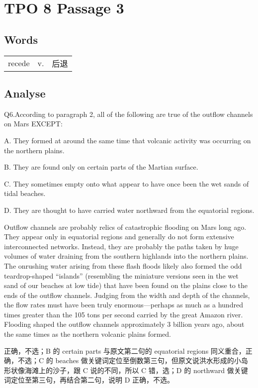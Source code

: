 \section{TPO 8 Passage 3}

\subsection{Words}

\begin{tabular}{lll}
    recede & v. & 后退 \\
\end{tabular}

\subsection{Analyse}

\begin{blk}
    \begin{qst}
        Q6.According to paragraph 2, all of the following are true of the outflow channels on Mars EXCEPT:
    \end{qst}

    \begin{chc}
        A. They formed at around the same time that volcanic activity was occurring on the northern plains.

        B. They are found only on certain parts of the Martian surface.

        C. They sometimes empty onto what appear to have once been the wet sands of tidal beaches.

        D. They are thought to have carried water northward from the equatorial regions.
    \end{chc}

    \begin{psgq}
        Outflow channels are probably relics of catastrophic flooding on Mars long ago. They appear only in equatorial regions and generally do not form extensive interconnected networks. Instead, they are probably the paths taken by huge volumes of water draining from the southern highlands into the northern plains. The onrushing water arising from these flash floods likely also formed the odd teardrop-shaped “islands” (resembling the miniature versions seen in the wet sand of our beaches at low tide) that have been found on the plains close to the ends of the outflow channels. Judging from the width and depth of the channels, the flow rates must have been truly enormous—perhaps as much as a hundred times greater than the 105 tons per second carried by the great Amazon river. Flooding shaped the outflow channels approximately 3 billion years ago, about the same times as the northern volcanic plains formed.
    \end{psgq}

    \begin{nlz}
        正确，不选；B 的 certain parts 与原文第二句的 equatorial regions 同义重合，正确，不选；C 的 beaches 做关键词定位至倒数第三句，但原文说洪水形成的小岛形状像海滩上的沙子，跟 C 说的不同，所以 C 错，选；D 的 northward 做关键词定位至第三句，再结合第二句，说明 D 正确，不选。
    \end{nlz}
\end{blk}


